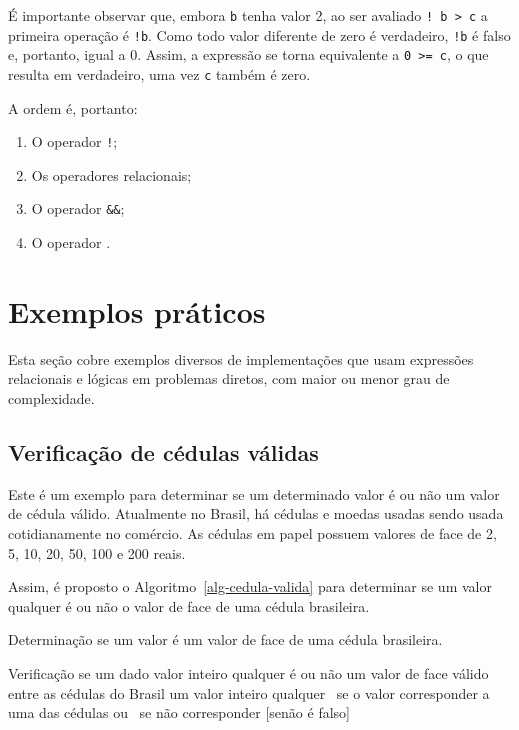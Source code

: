 \documentclass[
  11pt,
  a4paper,
]{scrbook}
\providecommand{\tightlist}{%
  \setlength{\itemsep}{0pt}\setlength{\parskip}{0pt}}\usepackage{longtable,booktabs,array}
\begin{document}
É importante observar que, embora \texttt{b} tenha valor 2, ao ser
avaliado \texttt{!\ b\ \textgreater{}\ c} a primeira operação é
\texttt{!b}. Como todo valor diferente de zero é verdadeiro, \texttt{!b}
é falso e, portanto, igual a 0. Assim, a expressão se torna equivalente
a \texttt{0\ \textgreater{}=\ c}, o que resulta em verdadeiro, uma vez
\texttt{c} também é zero.

A ordem é, portanto:

\begin{enumerate}
\tightlist
\item
  O operador \texttt{!};
\item
  Os operadores relacionais;
\item
  O operador \texttt{\&\&};
\item
  O operador \texttt{\textbar{}\textbar{}}.
\end{enumerate}

\section{Exemplos práticos}\label{exemplos-pruxe1ticos}

Esta seção cobre exemplos diversos de implementações que usam expressões
relacionais e lógicas em problemas diretos, com maior ou menor grau de
complexidade.

\subsection{Verificação de cédulas
válidas}\label{verificauxe7uxe3o-de-cuxe9dulas-vuxe1lidas}

Este é um exemplo para determinar se um determinado valor é ou não um
valor de cédula válido. Atualmente no Brasil, há cédulas e moedas usadas
sendo usada cotidianamente no comércio. As cédulas em papel possuem
valores de face de 2, 5, 10, 20, 50, 100 e 200 reais.

Assim, é proposto o Algoritmo~\ref{alg-cedula-valida} para determinar se
um valor qualquer é ou não o valor de face de uma cédula brasileira.

\begin{algorithm}
\caption{\label{alg-cedula-valida}Determinação se um valor é um valor de
face de uma cédula brasileira.}
\begingroup%

\begin{algorithmic}
    \Description Verificação se um dado valor inteiro qualquer é ou não um valor de face válido entre as cédulas do Brasil
    \Require um valor inteiro qualquer
    \Ensure \True\ se o valor corresponder a uma das cédulas ou \False\ se não corresponder
    \Statex{}
    [senão é falso]
\end{algorithmic}

\endgroup
\end{algorithm}
\end{document}

